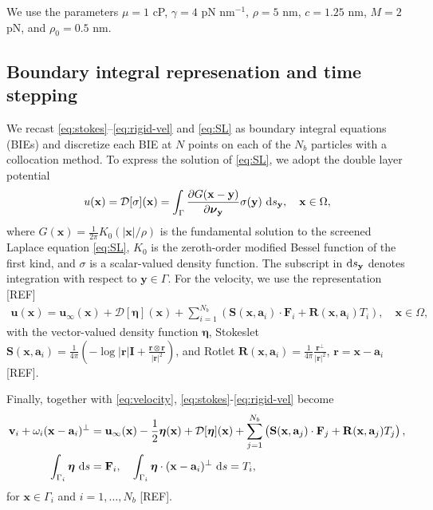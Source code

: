 \documentclass[prb,preprint,showpacs,preprintnumbers,amsmath,amssymb,longbibliography]{revtex4-1}
\renewcommand{\aa}{\mathbf{a}}
\newcommand{\DD}{\mathcal{D}}
\newcommand{\eeta}{\boldsymbol{\eta}}
\newcommand{\FF}{\mathbf{F}}
\newcommand{\nnu}{\boldsymbol{\nu}}
\newcommand{\rr}{\mathbf{r}}
\newcommand{\RR}{\mathbf{R}}
\renewcommand{\SS}{\mathbf{S}}
\newcommand{\xx}{\mathbf{x}}
\newcommand{\uu}{\mathbf{u}}
\renewcommand{\vv}{\mathbf{v}}
\newcommand{\yy}{\mathbf{y}}
\begin{document}
We use the parameters $\mu = 1$ cP, $\gamma = 4$ pN nm$^{-1}$,
$\rho = 5$ nm, $c = 1.25$ nm, $M = 2$ pN, and $\rho_0 = 0.5$ nm.

\subsection{Boundary integral represenation and time stepping}
We recast \eqref{eq:stokes}--\eqref{eq:rigid-vel} and \eqref{eq:SL}
as boundary integral equations (BIEs) and discretize each BIE at
$N$ points on each of the $N_b$ particles with a collocation method.
To express the solution of \eqref{eq:SL},
we adopt the double layer potential
\begin{align}
\label{eq:SL_BIE}
u({\bf x}) = \DD[\sigma](\xx) = \int_\Gamma \frac{\partial G(\xx-\yy)}{\partial \nnu_\yy}\sigma(\yy)\, \dif s_\yy
, \quad \xx \in \Omega,
\end{align}
where $G(\xx) = \frac{1}{2\pi}K_0(|\xx|/\rho)$ is the fundamental solution to the screened Laplace equation \eqref{eq:SL},
$K_0$ is the zeroth-order modified Bessel function of the first kind,
and $\sigma$ is a scalar-valued density function.
The subscript in $\dif s_\yy$ denotes integration with respect to $\yy \in \Gamma$. 
For the velocity, we use the representation [REF]
\begin{align}
  \label{eq:velocity}
  \uu(\xx) = \uu_\infty(\xx) + \DD[\eeta](\xx) + 
    \sum_{i=1}^{N_b} \left(\SS(\xx,\aa_i) \cdot \FF_i + 
    \RR(\xx,\aa_i) T_i\right), \quad \xx \in \Omega,
\end{align}
with the vector-valued density function $\eeta$,
Stokeslet 
$\SS(\xx,\aa_i) = \frac{1}{4\pi} \left(-\log |\rr|\mathbf{I} + \frac{\rr \otimes \rr}{|\rr|^2}\right)$,
and Rotlet
$\RR(\xx,\aa_i) = \frac{1}{4\pi} \frac{\rr^\perp}{|\rr|^2}$,
$\rr = \xx - \aa_i$ [REF].
    

Finally, together with \eqref{eq:velocity},
\eqref{eq:stokes}-\eqref{eq:rigid-vel} become 
\begin{alignat}{3}
  \label{eq:vel_BLM_rep}
  \vv_i + \omega_i (\xx - \aa_i)^\perp &= \uu_\infty(\xx)
    -\frac{1}{2} \eeta(\xx) + \DD[\eeta](\xx) 
    + \sum_{j=1}^{N_b} 
    \left(\SS(\xx,\aa_j) \cdot \FF_j + \RR(\xx,\aa_j) T_j\right),\\
  \label{eq:mobility}
  \int_{\Gamma_i} \eeta \, \dif s &= \mathbf{F}_i, \quad
  \int_{\Gamma_i} \eeta \cdot (\xx-\aa_i)^\perp \, \dif s = T_i,
\end{alignat}
for $\xx \in \Gamma_i$ and $i = 1,\dots,N_b$ [REF].
\end{document}
